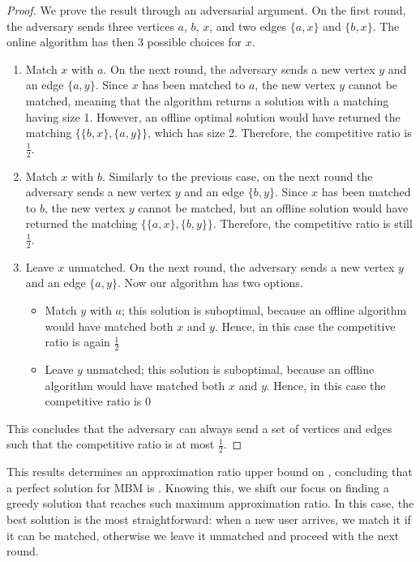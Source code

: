 \documentclass[a4paper, 12pt]{report}
\begin{document}
    \begin{proof}
        We prove the result through an adversarial argument. On the first round, the adversary sends three vertices $a$, $b$, $x$, and two edges $\{a, x\}$ and $\{b, x\}$. The online algorithm has then 3 possible choices for $x$.

        \begin{enumerate}
            \item Match $x$ with $a$. On the next round, the adversary sends a new vertex $y$ and an edge $\{a, y\}$. Since $x$ has been matched to $a$, the new vertex $y$ cannot be matched, meaning that the algorithm returns a solution with a matching having size 1. However, an offline optimal solution would have returned the matching $\{\{b, x\}, \{a, y\}\}$, which has size 2. Therefore, the competitive ratio is $\tfrac{1}{2}$.
            \item Match $x$ with $b$. Similarly to the previous case, on the next round the adversary sends a new vertex $y$ and an edge $\{b, y\}$. Since $x$ has been matched to $b$, the new vertex $y$ cannot be matched, but an offline solution would have returned the matching $\{\{a, x\}, \{b, y\}\}$. Therefore, the competitive ratio is still $\tfrac{1}{2}$.
            \item Leave $x$ unmatched. On the next round, the adversary sends a new vertex $y$ and an edge $\{a, y\}$. Now our algorithm has two options.

                \begin{itemize}
                    \item Match $y$ with $a$; this solution is suboptimal, because an offline algorithm would have matched both $x$ and $y$. Hence, in this case the competitive ratio is again $\tfrac{1}{2}$
                    \item Leave $y$ unmatched; this solution is suboptimal, because an offline algorithm would have matched both $x$ and $y$. Hence, in this case the competitive ratio is 0
                \end{itemize}
        \end{enumerate}

        This concludes that the adversary can always send a set of vertices and edges such that the competitive ratio is at most $\tfrac{1}{2}$.
    \end{proof}

    This results determines an approximation ratio upper bound on , concluding that a perfect solution for MBM is . Knowing this, we shift our focus on finding a greedy solution that reaches such maximum approximation ratio. In this case, the best solution is the most straightforward: when a new user arrives, we match it if it can be matched, otherwise we leave it unmatched and proceed with the next round.
\end{document}
